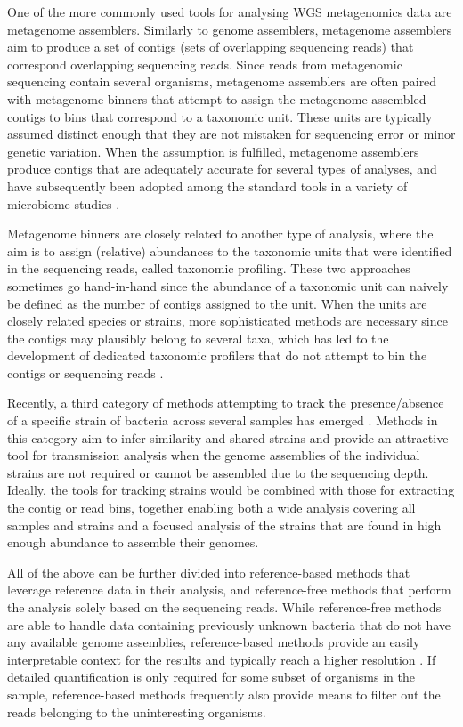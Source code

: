 \documentclass[officiallayout]{tktla}
\begin{document}
One of the more commonly used tools for analysing WGS metagenomics
data are metagenome assemblers. Similarly to genome assemblers,
metagenome assemblers aim to produce a set of contigs (sets of
overlapping sequencing reads) that correspond overlapping sequencing
reads. Since reads from metagenomic sequencing contain several
organisms, metagenome assemblers are often paired with metagenome
binners that attempt to assign the metagenome-assembled contigs to
bins that correspond to a taxonomic unit. These units are typically
assumed distinct enough that they are not mistaken for sequencing
error or minor genetic variation. When the assumption is fulfilled,
metagenome assemblers produce contigs that are adequately accurate for
several types of analyses, and have subsequently been adopted among
the standard tools in a variety of microbiome studies
\citep{bertrand2019hybrid, somerville2019long, stewart2019compendium}.

Metagenome binners are closely related to another type of analysis,
where the aim is to assign (relative) abundances to the taxonomic
units that were identified in the sequencing reads, called taxonomic
profiling. These two approaches sometimes go hand-in-hand since the
abundance of a taxonomic unit can naively be defined as the number of
contigs assigned to the unit. When the units are closely related
species or strains, more sophisticated methods are necessary since the
contigs may plausibly belong to several taxa, which has led to the
development of dedicated taxonomic profilers that do not attempt to
bin the contigs or sequencing reads \citep{beghini2021integrating,
  truong2017microbial, maklin_high-resolution_2021, van2022strainge}.

Recently, a third category of methods attempting to track the
presence/absence of a specific strain of bacteria across several
samples has emerged \citep{van2022strainge, truong2017microbial,
  nayfach2016integrated}. Methods in this category aim to infer
similarity and shared strains and provide an attractive tool for
transmission analysis when the genome assemblies of the individual
strains are not required or cannot be assembled due to the sequencing
depth. Ideally, the tools for tracking strains would be combined with
those for extracting the contig or read bins, together enabling both a
wide analysis covering all samples and strains and a focused analysis
of the strains that are found in high enough abundance to assemble
their genomes.

All of the above can be further divided into reference-based methods
that leverage reference data in their analysis, and reference-free
methods that perform the analysis solely based on the sequencing
reads. While reference-free methods are able to handle data containing
previously unknown bacteria that do not have any available genome
assemblies, reference-based methods provide an easily interpretable
context for the results and typically reach a higher resolution
\citep{hiraoka2016metagenomics, thomas2012metagenomics}. If detailed
quantification is only required for some subset of organisms in the
sample, reference-based methods frequently also provide means to
filter out the reads belonging to the uninteresting organisms.
\end{document}

